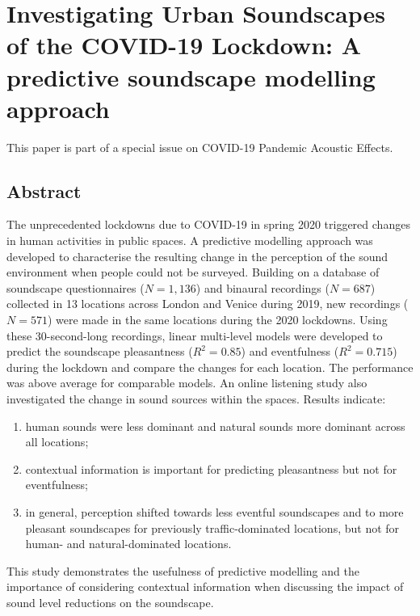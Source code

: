 \chapter{Investigating Urban Soundscapes of the COVID-19 Lockdown: A predictive soundscape modelling approach}
\label{ch:lockdown}

This paper is part of a special issue on COVID-19 Pandemic Acoustic Effects.


\section*{Abstract}
 The unprecedented lockdowns due to COVID-19 in spring 2020 triggered changes in human activities in public spaces. A predictive modelling approach was developed to characterise the resulting change in the perception of the sound environment when people could not be surveyed. Building on a database of soundscape questionnaires ($N = 1,136$) and binaural recordings ($N = 687$) collected in 13 locations across London and Venice during 2019, new recordings ($N = 571$) were made in the same locations during the 2020 lockdowns. Using these 30-second-long recordings, linear multi-level models were developed to predict the soundscape pleasantness ($R^2=0.85$) and eventfulness ($R^2=0.715$) during the lockdown and compare the changes for each location. The performance was above average for comparable models. An online listening study also investigated the change in sound sources within the spaces. Results indicate:

 \begin{enumerate}
   \item human sounds were less dominant and natural sounds more dominant across all locations;
   \item contextual information is important for predicting pleasantness but not for eventfulness;
   \item in general, perception shifted towards less eventful soundscapes and to more pleasant soundscapes for previously traffic-dominated locations, but not for human- and natural-dominated locations.
 \end{enumerate}

 This study demonstrates the usefulness of predictive modelling and the importance of considering contextual information when discussing the impact of sound level reductions on the soundscape.

